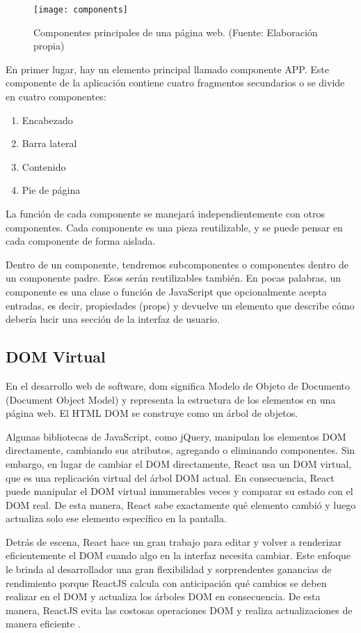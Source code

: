 \begin{figure}[H]
  \centering
  \texttt{[image: components]}
  \caption{Componentes principales de una página web. (Fuente: Elaboración propia)}
\end{figure}
En primer lugar, hay un elemento principal llamado componente APP. Este componente de la aplicación contiene cuatro fragmentos secundarios o se divide en cuatro componentes:
\begin{enumerate}
  \item Encabezado
  \item Barra lateral
  \item Contenido
  \item Pie de página
\end{enumerate}
La función de cada componente se manejará independientemente con otros componentes. Cada componente es una pieza reutilizable, y se puede pensar en cada componente de forma aislada.
\vspace{0.8cm}

Dentro de un componente, tendremos subcomponentes o componentes dentro de un componente padre. Esos serán reutilizables también. En pocas palabras, un componente es una clase o función de JavaScript que opcionalmente acepta entradas, es decir, propiedades (props) y devuelve un elemento que describe cómo debería lucir una sección de la interfaz de usuario.
\vspace{0.8cm}



\subsection{DOM Virtual}
En el desarrollo web de software, \acrshort{dom} significa Modelo de Objeto de Documento (Document Object Model) y representa la estructura de los elementos en una página web. El HTML DOM se construye como un árbol de objetos.

Algunas bibliotecas de JavaScript, como jQuery, manipulan los elementos DOM directamente, cambiando sus atributos, agregando o eliminando componentes. Sin embargo, en lugar de cambiar el DOM directamente, React usa un DOM virtual, que es una replicación virtual del árbol DOM actual. En consecuencia, React puede manipular el DOM virtual innumerables veces y comparar su estado con el DOM real. De esta manera, React sabe exactamente qué elemento cambió y luego actualiza solo ese elemento específico en la pantalla.

Detrás de escena, React hace un gran trabajo para editar y volver a \gls{renderizar} eficientemente el DOM cuando algo en la interfaz necesita cambiar. Este enfoque le brinda al desarrollador una gran flexibilidad y sorprendentes ganancias de rendimiento porque ReactJS calcula con anticipación qué cambios se deben realizar en el DOM y actualiza los árboles DOM en consecuencia. De esta manera, ReactJS evita las costosas operaciones DOM y realiza actualizaciones de manera eficiente \cite{stefanov}.
